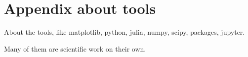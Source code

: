 \chapter{Appendix about tools}
\label{ch:tools_appendix}

About the tools, like matplotlib, python, julia, numpy, scipy, packages, jupyter.

Many of them are scientific work on their own.